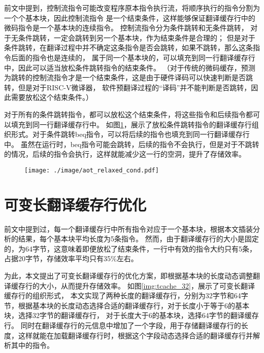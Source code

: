 前文中提到，控制流指令可能改变程序原本指令执行流，将顺序执行的指令分割为一个个基本块，因此控制流指令
是一个结束条件，这样能够保证翻译缓存行中的微码指令是一个基本块的连续指令。
控制流指令分为条件跳转和无条件跳转，
对于无条件跳转，一定会跳转到另一个基本块，作为结束条件是合理的；
但是对于条件跳转，在翻译过程中并不确定这条指令是否会跳转，如果不跳转，那么这条指令后面的指令也是连续的，
属于同一个基本块的，可以填充到同一行翻译缓存行中，因此可以适当放松条件跳转指令的结束条件。
（对于传统的微码缓存，预测为跳转的控制流指令才是一个结束条件，这是由于硬件译码可以快速判断是否跳转，但是对于RISC-V微译器，
软件预翻译过程的“译码”并不能判断是否跳转，因此需要放松这个结束条件。）

对于所有的条件跳转指令，都可以放松这个结束条件，将这些指令和后续指令都可以填充到同一行翻译缓存行中。
如图\ref{img:aot_relaxed_cond}，展示了放松条件跳转指令的翻译缓存行组织形式。对于条件跳转beq指令，可以将后续的指令也填充到同一行翻译缓存行中。
虽然在运行时，beq指令可能会跳转，后续的指令不会执行，但是对于不跳转的情况，后续的指令会执行，这样就能减少这一行的空洞，提升了存储效率。


\begin{figure}[!htbp]
    \centering
    \texttt{[image: ./image/aot\_relaxed\_cond.pdf]}
    \label{img:aot_relaxed_cond}
  \end{figure}


\section{可变长翻译缓存行优化}

前文中提到过，每一个翻译缓存行中所有指令对应于一个基本块，根据本文插装分析的结果，每个基本块平均长度为5条指令。
然而，由于翻译缓存行的大小是固定的，为64字节，这意味着即便放松了结束条件，一行中有效的指令大约只有5条，占据20字节，存储效率平均只有35\%左右。

为此，本文提出了可变长翻译缓存行的优化方案，即根据基本块的长度动态调整翻译缓存行的大小，从而提升存储效率。
如图\ref{img:tcache_32}，展示了可变长翻译缓存行的组织形式，
本文实现了两种长度的翻译缓存行，分别为32字节和64字节，根据基本块的长度动态选择合适的翻译缓存行，对于长度小于等于6的基本块，选择32字节的翻译缓存行，
对于长度大于6的基本块，选择64字节的翻译缓存行。
同时在翻译缓存行的元信息中增加了一个字段，用于存储翻译缓存行的长度，这样就能在加载翻译缓存行时，根据这个字段动态选择合适的翻译缓存行并解析其中的指令。

